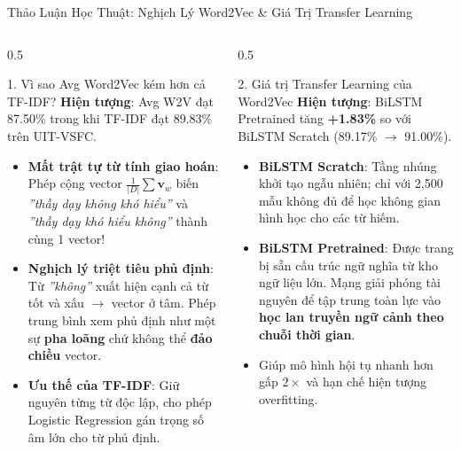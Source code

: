 \documentclass[aspectratio=169, 10pt]{beamer}
\begin{document}
\begin{frame}{Thảo Luận Học Thuật: Nghịch Lý Word2Vec \& Giá Trị Transfer Learning}
  \begin{columns}[t]
    \begin{column}{0.5\textwidth}
      \begin{alertblock}{1. Vì sao Avg Word2Vec kém hơn cả TF-IDF?}
        \fontsize{7.5}{9.5}\selectfont
        \textbf{Hiện tượng}: Avg W2V đạt 87.50\% trong khi TF-IDF đạt 89.83\% trên UIT-VSFC.
        \begin{itemize}
          \item \textbf{Mất trật tự từ tính giao hoán}: Phép cộng vector $\frac{1}{|D|}\sum \mathbf{v}_w$ biến \textit{''thầy dạy không khó hiểu''} và \textit{''thầy dạy khó hiểu không''} thành cùng 1 vector!
          \item \textbf{Nghịch lý triệt tiêu phủ định}: Từ \textit{''không''} xuất hiện cạnh cả từ tốt và xấu $\to$ vector ở tâm. Phép trung bình xem phủ định như một sự \textbf{pha loãng} chứ không thể \textbf{đảo chiều} vector.
          \item \textbf{Ưu thế của TF-IDF}: Giữ nguyên từng từ độc lập, cho phép Logistic Regression gán trọng số âm lớn cho từ phủ định.
        \end{itemize}
      \end{alertblock}
    \end{column}

    \begin{column}{0.5\textwidth}
      \begin{exampleblock}{2. Giá trị Transfer Learning của Word2Vec}
        \fontsize{7.5}{9.5}\selectfont
        \textbf{Hiện tượng}: BiLSTM Pretrained tăng \textbf{+1.83\%} so với BiLSTM Scratch (89.17\% $\to$ 91.00\%).
        \begin{itemize}
          \item \textbf{BiLSTM Scratch}: Tầng nhúng khởi tạo ngẫu nhiên; chỉ với 2,500 mẫu không đủ để học không gian hình học cho các từ hiếm.
          \item \textbf{BiLSTM Pretrained}: Được trang bị sẵn cấu trúc ngữ nghĩa từ kho ngữ liệu lớn. Mạng giải phóng tài nguyên để tập trung toàn lực vào \textbf{học lan truyền ngữ cảnh theo chuỗi thời gian}.
          \item Giúp mô hình hội tụ nhanh hơn gấp $2\times$ và hạn chế hiện tượng overfitting.
        \end{itemize}
      \end{exampleblock}
    \end{column}
  \end{columns}
\end{frame}
\end{document}
